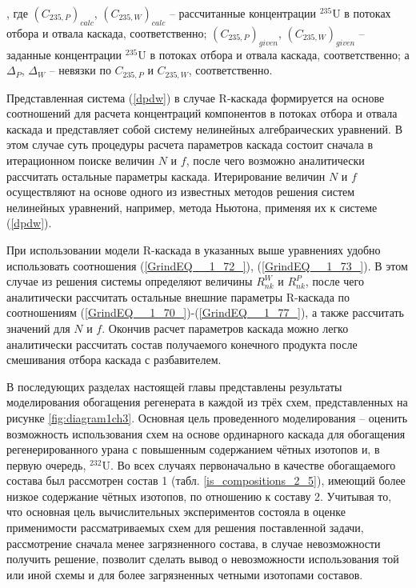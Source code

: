 , где ${(C_{235, P})}_{calc}$, ${(C_{235, W})}_{calc}$ -- рассчитанные концентрации $^{235}$U в потоках отбора и отвала каскада, соответственно; ${(C_{235, P})}_{given}$, ${(C_{235, W})}_{given}$ -- заданные концентрации $^{235}$U в потоках отбора и отвала каскада, соответственно; а $\Delta_{P}$, $\Delta_{W}$ -- невязки по $C_{235, P}$ и $C_{235, W}$, соответственно. 

Представленная система (\ref{dpdw}) в случае R-каскада формируется на основе соотношений для расчета концентраций компонентов в потоках отбора и отвала каскада и представляет собой систему нелинейных алгебраических уравнений. В этом случае суть процедуры расчета параметров каскада состоит сначала в итерационном поиске величин $N$ и $f$, после чего возможно аналитически рассчитать остальные параметры каскада. Итерирование величин $N$ и $f$ осуществляют на основе одного из известных методов решения систем нелинейных уравнений, например, метода Ньютона, применяя их к системе (\ref{dpdw}). 

При использовании модели R-каскада в указанных выше уравнениях удобно использовать соотношения (\ref{GrindEQ__1_72_}), (\ref{GrindEQ__1_73_}). В этом случае из решения системы определяют величины $R_{n k}^{W}$ и $R_{n k}^{P}$, после чего аналитически рассчитать остальные внешние параметры R-каскада по соотношениям (\ref{GrindEQ__1_70_})-(\ref{GrindEQ__1_77_}), а также рассчитать значений для $N$ и $f$. Окончив расчет параметров каскада можно легко аналитически рассчитать состав получаемого конечного продукта после смешивания отбора каскада с разбавителем.

В последующих разделах настоящей главы представлены результаты моделирования обогащения регенерата в каждой из трёх схем, представленных на рисунке \ref{fig:diagram1ch3}. 
Основная цель проведенного моделирования -- оценить возможность использования схем на основе ординарного каскада для обогащения регенерированного урана с повышенным содержанием чётных изотопов и, в первую очередь, $^{232}$U. Во всех случаях первоначально в качестве обогащаемого состава был рассмотрен состав 1 (табл. \ref{is_compositions_2_5}), имеющий более низкое содержание чётных изотопов, по отношению к составу 2. Учитывая то, что основная цель вычислительных экспериментов состояла в оценке применимости рассматриваемых схем для решения поставленной задачи, рассмотрение сначала менее загрязненного состава, в случае невозможности получить решение, позволит сделать вывод о невозможности использования той или иной схемы и для более загрязненных четными изотопами составов.

